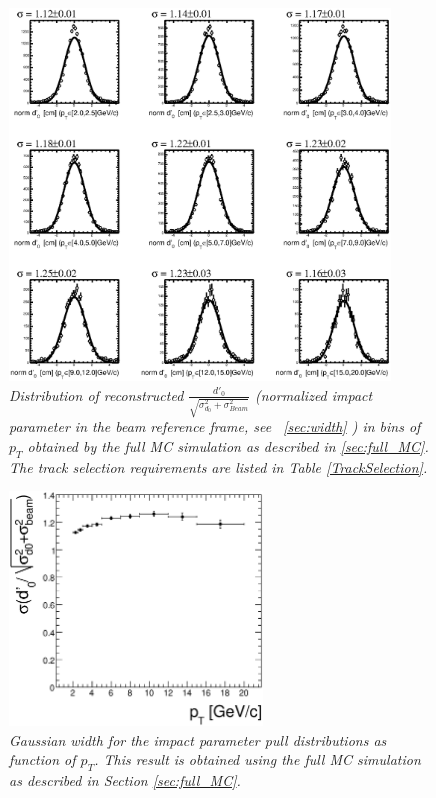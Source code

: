 \documentclass{cmspaper}
\begin{document}
\begin{figure}[htp]
  \centering
    \includegraphics[width=0.9\textwidth]{figures/fxy_d0norm_array.eps}
      
    \caption{\it Distribution of reconstructed  $\frac{d'_{0}}{\sqrt{\sigma_{d_{0}}^2 +\sigma_{Beam}^2}}$ (normalized impact parameter in the beam reference frame, see ~\ref{sec:width} )
      in bins of $p_{T}$ obtained by the full MC simulation as described in \ref{sec:full_MC}. The track selection requirements are listed 
      in Table \ref{TrackSelection}.
    }
    \label{fig:normd0prime}
\end{figure}

\begin{figure}[htp]
  \centering
    \includegraphics[width=0.6\textwidth]{figures/fxy_norm_sig.eps}
      
    \caption{\it  Gaussian width for the impact parameter pull distributions  as function of $p_{T}$.
 This result is obtained  using the full MC simulation as described in Section \ref{sec:full_MC}. 
    }
    \label{fig:norm_d0prime_fit}
\end{figure}
\end{document}
